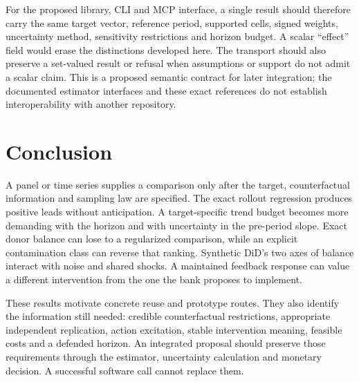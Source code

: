 For the proposed library, CLI and MCP interface, a single result should
therefore carry the same target vector, reference period, supported
cells, signed weights, uncertainty method, sensitivity restrictions
and horizon budget. A scalar ``effect'' field would erase the
distinctions developed here. The transport should also preserve a
set-valued result or refusal when assumptions or support do not
admit a scalar claim. This is a proposed semantic contract for later
integration; the documented estimator interfaces and these exact
references do not establish interoperability with another repository.



\section{Conclusion}
\label{exec17:s6-end}

A panel or time series supplies a comparison only after the target,
counterfactual information and sampling law are specified. The exact
rollout regression produces positive leads without anticipation.
A target-specific trend budget becomes more demanding with the
horizon and with uncertainty in the pre-period slope. Exact donor
balance can lose to a regularized comparison, while an explicit
contamination class can reverse that ranking. Synthetic DiD's two
axes of balance interact with noise and shared shocks. A maintained
feedback response can value a different intervention from the one
the bank proposes to implement.

These results motivate concrete reuse and prototype routes. They
also identify the information still needed: credible counterfactual
restrictions, appropriate independent replication, action excitation,
stable intervention meaning, feasible costs and a defended horizon.
An integrated proposal should preserve those requirements through
the estimator, uncertainty calculation and monetary decision. A
successful software call cannot replace them.
